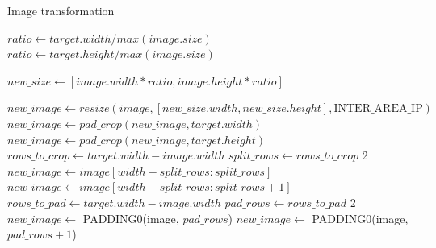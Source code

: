 \begin{algorithm}
\caption{Image transformation}
\label{c4:algorithm}
\begin{algorithmic}[1]
        \State $ratio \leftarrow target.width/max(image.size) $
        \State $ratio \leftarrow target.height/max(image.size) $
    \EndIf

    \State $new\_size \leftarrow [image.width*ratio, image.height*ratio]$

    \State $new\_image \leftarrow resize(image, [new\_size.width, new\_size.height], \text{INTER\_AREA\_IP}) $
    \State
        \State $new\_image \leftarrow pad\_crop(new\_image, target.width)$
        \State $new\_image \leftarrow pad\_crop(new\_image, target.height)$
    \EndIf
\EndProcedure
\State
{}
        \State $rows\_to\_crop \leftarrow target.width - image.width$
        \State $split\_rows \leftarrow rows\_to\_crop$  2
            \State $new\_image \leftarrow image[width-split\_rows: split\_rows]$
        \Else {}
            \State $new\_image \leftarrow image[width-split\_rows: split\_rows+1]$
        \EndIf
    \Else
        \State $rows\_to\_pad \leftarrow target.width - image.width$
        \State $pad\_rows \leftarrow rows\_to\_pad$  2
            \State $new\_image \leftarrow$ PADDING0(image, $pad\_rows$)
        \Else {}
            \State $new\_image \leftarrow$ PADDING0(image, $pad\_rows+1$)
        \EndIf
    \EndIf
\EndProcedure
\end{algorithmic}
\end{algorithm}



